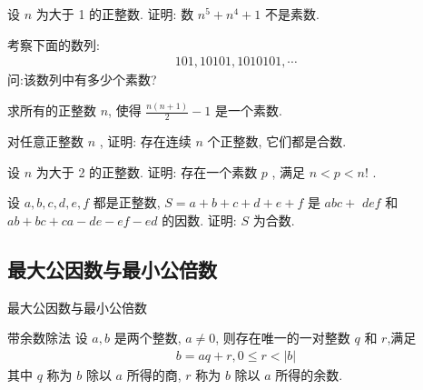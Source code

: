\documentclass[aspectratio=169]{ctexbeamer}
\theoremstyle{definition}
\begin{document}
\begin{frame}[t]
	\begin{example}
		设 $n$ 为大于 1 的正整数. 证明: 数 $n^{5}+n^{4}+1$ 不是素数.
	\end{example}
\end{frame}

\begin{frame}[t]
	\begin{example}
		考察下面的数列:
		\begin{align*}
			101,10101,1010101, \cdots
		\end{align*}
		问:该数列中有多少个素数?
	\end{example}
\end{frame}

\begin{frame}[t]
	\begin{example}
		求所有的正整数 $n$, 使得 $\frac{n(n+1)}{2}-1$ 是一个素数.
	\end{example}
\end{frame}

\begin{frame}[t]
	\begin{example}
		对任意正整数 $n$ , 证明: 存在连续 $n$ 个正整数, 它们都是合数.
	\end{example}
\end{frame}

\begin{frame}[t]
	\begin{example}
		设 $n$ 为大于 2 的正整数. 证明: 存在一个素数 $p$ , 满足 $n<p<n!$ .
	\end{example}
\end{frame}

\begin{frame}[t]
	\begin{example}
		设 $a ,  b ,  c ,  d ,  e ,  f$ 都是正整数,  $S=a+b+c+d+e+f$ 是 $a b c+$ $d e f$ 和 $a b+b c+c a-d e-e f-e d$ 的因数. 证明: $S$ 为合数.
	\end{example}
\end{frame}

\subsection{最大公因数与最小公倍数}\setcounter{theorem}{0}
\begin{frame}{最大公因数与最小公倍数}
	\begin{block}{带余数除法}
		设 $a ,  b$ 是两个整数, $a \neq 0$, 则存在唯一的一对整数 $q$ 和 $r$,满足
		\begin{align*}
			b=a q+r, 0 \leqslant r<|b|
		\end{align*}
		其中 $q$ 称为 $b$ 除以 $a$ 所得的商, $r$ 称为 $b$ 除以 $a$ 所得的余数.\\
	\end{block}
\end{frame}
\end{document}
